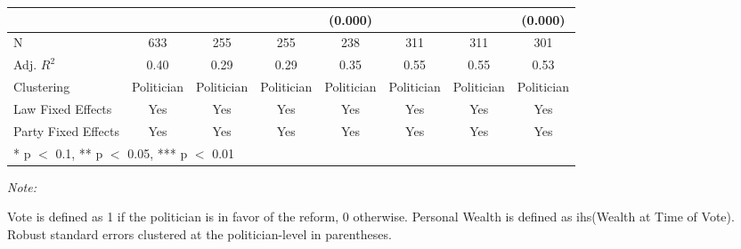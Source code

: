 \begin{table}[!h]
{\begin{threeparttable}
\begin{tabular}[t]{lccccccc}
 &  &  &  & (\num{0.000}) &  &  & (\num{0.000})\\
\midrule
N & \num{633} & \num{255} & \num{255} & \num{238} & \num{311} & \num{311} & \num{301}\\
Adj. $R^2$ & \num{0.40} & \num{0.29} & \num{0.29} & \num{0.35} & \num{0.55} & \num{0.55} & \num{0.53}\\
Clustering & Politician & Politician & Politician & Politician & Politician & Politician & Politician\\
Law Fixed Effects & Yes & Yes & Yes & Yes & Yes & Yes & Yes\\
Party Fixed Effects & Yes & Yes & Yes & Yes & Yes & Yes & Yes\\
\bottomrule
\multicolumn{8}{l}{\rule{0pt}{1em}* p $<$ 0.1, ** p $<$ 0.05, *** p $<$ 0.01}\\
\end{tabular}
\begin{tablenotes}[para]
\item \textit{Note:} 
\item Vote is defined as 1 if the politician is in favor of the reform, 0 otherwise. Personal Wealth is defined as ihs(Wealth at Time of Vote). Robust standard errors clustered at the politician-level in parentheses.
\end{tablenotes}
\end{threeparttable}}
\end{table}
